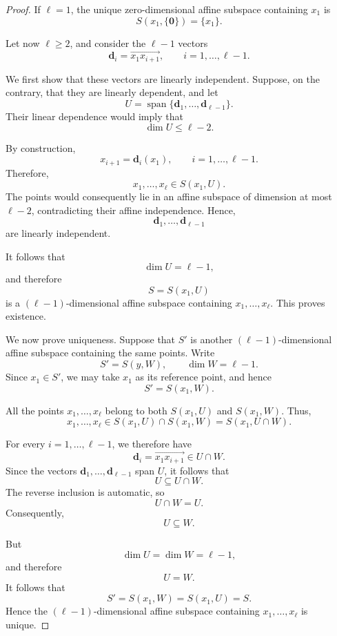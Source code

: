 \documentclass[12pt]{article}
\begin{document}
\begin{proof}
If \(\ell=1\), the unique zero-dimensional affine subspace containing
\(x_1\) is
\[
S(x_1,\{\mathbf 0\})=\{x_1\}.
\]

Let now \(\ell\geq2\), and consider the \(\ell-1\) vectors
\[
\mathbf d_i=\overrightarrow{x_1x_{i+1}},
\qquad i=1,\ldots,\ell-1.
\]

We first show that these vectors are linearly independent. Suppose,
on the contrary, that they are linearly dependent, and let
\[
U=\operatorname{span}
\{\mathbf d_1,\ldots,\mathbf d_{\ell-1}\}.
\]
Their linear dependence would imply that
\[
\dim U\leq \ell-2.
\]

By construction,
\[
x_{i+1}=\mathbf d_i(x_1),
\qquad i=1,\ldots,\ell-1.
\]
Therefore,
\[
x_1,\ldots,x_\ell\in S(x_1,U).
\]
The points would consequently lie in an affine subspace of dimension
at most \(\ell-2\), contradicting their affine independence. Hence,
\[
\mathbf d_1,\ldots,\mathbf d_{\ell-1}
\]
are linearly independent.

It follows that
\[
\dim U=\ell-1,
\]
and therefore
\[
S=S(x_1,U)
\]
is a \((\ell-1)\)-dimensional affine subspace containing
\(x_1,\ldots,x_\ell\). This proves existence.

We now prove uniqueness. Suppose that \(S'\) is another
\((\ell-1)\)-dimensional affine subspace containing the same points.
Write
\[
S'=S(y,W),
\qquad
\dim W=\ell-1.
\]
Since \(x_1\in S'\), we may take \(x_1\) as its reference point, and
hence
\[
S'=S(x_1,W).
\]

All the points \(x_1,\ldots,x_\ell\) belong to both \(S(x_1,U)\) and
\(S(x_1,W)\). Thus,
\[
x_1,\ldots,x_\ell
\in
S(x_1,U)\cap S(x_1,W)
=
S(x_1,U\cap W).
\]

For every \(i=1,\ldots,\ell-1\), we therefore have
\[
\mathbf d_i
=
\overrightarrow{x_1x_{i+1}}
\in U\cap W.
\]
Since the vectors \(\mathbf d_1,\ldots,\mathbf d_{\ell-1}\) span \(U\),
it follows that
\[
U\subseteq U\cap W.
\]
The reverse inclusion is automatic, so
\[
U\cap W=U.
\]
Consequently,
\[
U\subseteq W.
\]

But
\[
\dim U=\dim W=\ell-1,
\]
and therefore
\[
U=W.
\]
It follows that
\[
S'=S(x_1,W)=S(x_1,U)=S.
\]
Hence the \((\ell-1)\)-dimensional affine subspace containing
\(x_1,\ldots,x_\ell\) is unique.
\end{proof}
\end{document}
